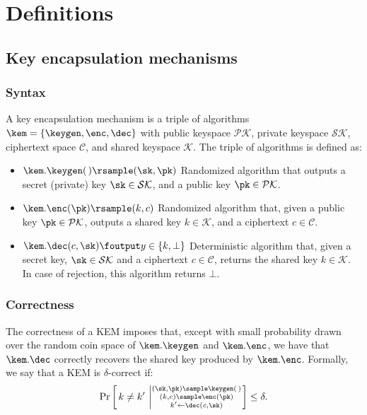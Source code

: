 \section{Definitions}\label{sec:prelims}


\subsection{Key encapsulation mechanisms}\label{sec:kems}

\subsubsection{Syntax}

\begin{definition}
    \label{def:kem}
    A key encapsulation mechanism is a triple of algorithms $\kem = \{\keygen, \enc, \dec\}$ with public keyspace $\mathcal{PK}$, private keyspace $\mathcal{SK}$, ciphertext space $\mathcal{C}$, and shared keyspace $\mathcal{K}$.
    The triple of algorithms is defined as:
    \begin{itemize}
    \item
        $\kem.\keygen(\, )\rsample (\sk, \pk)$ Randomized algorithm that outputs a secret (private) key $\sk \in \mathcal{SK}$, and a public key $\pk \in \mathcal{PK}$.
    \item
        $\kem.\enc(\pk)\rsample (k, c)$ Randomized algorithm that, given a public key $\pk \in \mathcal{PK}$, outputs a shared key $k \in \mathcal{K}$, and a ciphertext $c \in \mathcal{C}$.
    \item
        $\kem.\dec(c, \sk)\foutput y \in \{k, \bot\}$ Deterministic algorithm that, given a secret key, $\sk \in \mathcal{SK}$ and a ciphertext $c \in \mathcal{C}$, returns the shared key $k \in \mathcal{K}$.
        In case of rejection, this algorithm returns $\bot$.
    \end{itemize}
\end{definition}


\subsubsection{Correctness}\label{sec:kem-correctness}

The correctness of a KEM imposes that, except with small probability drawn over the random coin space of $\kem.\keygen$ and $\kem.\enc$, we have that $\kem.\dec$ correctly recovers the shared key produced by $\kem.\enc$.
Formally, we say that a KEM is $\delta$-correct if:
\[
    \Pr \left[\,  k \ne k' \, \left | \substack{(\sk, \pk) \sample \keygen(\,) \\ (k, c) \sample \enc(\pk) \\ k' \gets \dec(c, \sk) } \right. \right] \le \delta .
\]


